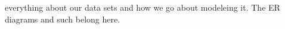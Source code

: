 everything about our data sets and how we go about modeleing it.
The ER diagrams and such belong here.
